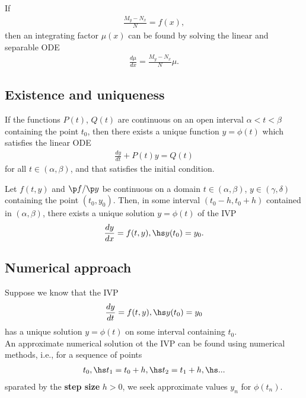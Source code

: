 \documentclass{article}
\begin{document}
\begin{theorem}
	If
	\begin{align*}
		\frac{M_y-N_x}{N}=f(x),
	\end{align*}
	then an integrating factor $\mu(x)$
	can be found by solving the linear and separable ODE
	\begin{align*}
		\frac{d\mu}{dx}=\frac{M_y-N_x}{N}\mu.
	\end{align*}
\end{theorem}


\subsection{Existence and uniqueness}


\begin{theorem}
	If the functions $P(t)$, $Q(t)$ are continuous on an open interval
	$\alpha<t<\beta$ containing the point $t_0$, then there exists a
	unique function $y=\phi(t)$ which satisfies the linear ODE
	\begin{align*}
		\frac{dy}{dt}+P(t)y=Q(t)
	\end{align*}
	for all $t\in(\alpha,\beta)$, and that satisfies the initial condition.
\end{theorem}

\begin{theorem}
	Let $f(t,y)$ and $\p f/\p y$ be continuous on a domain $t\in(\alpha,\beta)$,
	$y\in(\gamma,\delta)$ containing the point $(t_0, y_0)$. Then, in some
	interval $(t_0-h, t_0+h)$ contained in $(\alpha, \beta)$, there exists
	a unique solution $y=\phi(t)$ of the IVP
	\begin{align*}
		\frac{dy}{dx}=f(t,y),\hs y(t_0) = y_0.
	\end{align*}
\end{theorem}


\subsection{Numerical approach}


\begin{theorem}
	Suppose we know that the IVP
	\begin{align*}
		\frac{dy}{dt} = f(t,y),\hs y(t_0) = y_0
	\end{align*}
	has a unique solution $y=\phi(t)$ on some interval containing $t_0$.\\
	An approximate numerical solution ot the IVP can be found using
	numerical methods, i.e., for a sequence of points
	\begin{align*}
		t_0,\hs t_1=t_0+h,\hs t_2=t_1+h,\hs...
	\end{align*}
	sparated by the \textbf{step size} $h>0$, we seek approximate values
	$y_n$ for $\phi(t_n)$.
\end{theorem}
\end{document}
